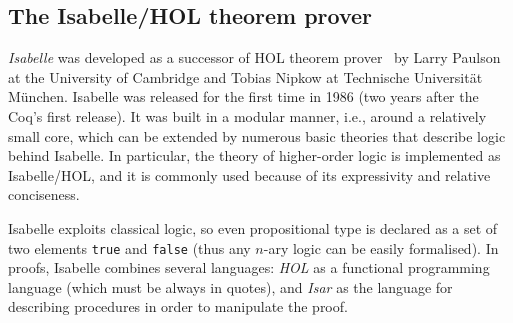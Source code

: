 \documentclass[article]{aaltoseries}
\begin{document}


\subsection{The Isabelle/HOL theorem prover}
\label{sec:prover_isabelle}

\textit{Isabelle} was developed as a successor of HOL theorem prover~\cite{tool_HOL} by Larry Paulson at the University of Cambridge and Tobias Nipkow at Technische Universität München. Isabelle was released for the first time in 1986 (two years after the Coq's first release). It was built in a modular manner, i.e., around a relatively small core, which can be extended by numerous basic theories that describe logic behind Isabelle. In particular, the theory of higher-order logic is implemented as Isabelle/HOL, and it is commonly used because of its expressivity and relative conciseness. 

Isabelle exploits classical logic, so even propositional type is declared as a set of two elements \texttt{true} and \texttt{false} (thus any $n$-ary logic can be easily formalised). In proofs, Isabelle combines several languages: \textit{HOL} as a functional programming language (which must be always in quotes), and \textit{Isar} as the language for describing procedures in order to manipulate the proof.


\end{document}
